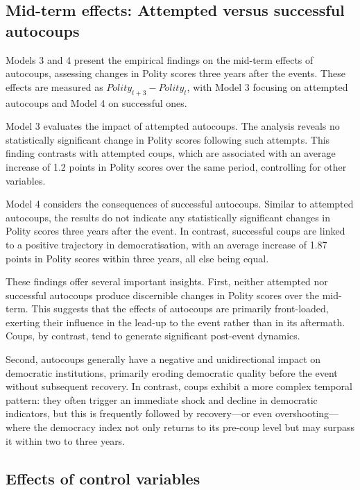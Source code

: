 \documentclass[
  12pt,
]{report}
\begin{document}
\subsection{Mid-term effects: Attempted versus successful
autocoups}\label{mid-term-effects-attempted-versus-successful-autocoups}

Models 3 and 4 present the empirical findings on the mid-term effects of
autocoups, assessing changes in Polity scores three years after the
events. These effects are measured as
\(Polity_{t+3} - Polity_{t}\)\hspace{0pt}, with Model 3 focusing on
attempted autocoups and Model 4 on successful ones.

Model 3 evaluates the impact of attempted autocoups. The analysis
reveals no statistically significant change in Polity scores following
such attempts. This finding contrasts with attempted coups, which are
associated with an average increase of 1.2 points in Polity scores over
the same period, controlling for other variables.

Model 4 considers the consequences of successful autocoups. Similar to
attempted autocoups, the results do not indicate any statistically
significant changes in Polity scores three years after the event. In
contrast, successful coups are linked to a positive trajectory in
democratisation, with an average increase of 1.87 points in Polity
scores within three years, all else being equal.

These findings offer several important insights. First, neither
attempted nor successful autocoups produce discernible changes in Polity
scores over the mid-term. This suggests that the effects of autocoups
are primarily front-loaded, exerting their influence in the lead-up to
the event rather than in its aftermath. Coups, by contrast, tend to
generate significant post-event dynamics.

Second, autocoups generally have a negative and unidirectional impact on
democratic institutions, primarily eroding democratic quality before the
event without subsequent recovery. In contrast, coups exhibit a more
complex temporal pattern: they often trigger an immediate shock and
decline in democratic indicators, but this is frequently followed by
recovery---or even overshooting---where the democracy index not only
returns to its pre-coup level but may surpass it within two to three
years.

\subsection{Effects of control
variables}\label{effects-of-control-variables}
\end{document}
